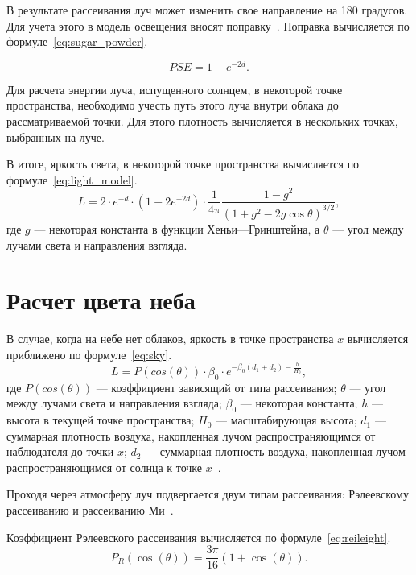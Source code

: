 В результате рассеивания луч может изменить свое направление на 180 градусов.
Для учета этого в модель освещения вносят поправку~\mbox{\cite{hzd, frostbite}}. Поправка вычисляется по формуле~\eqref{eq:sugar_powder}.

\begin{equation}
	\label{eq:sugar_powder}
	PSE = 1 - e ^ {-2 d}.
\end{equation}

Для расчета энергии луча, испущенного солнцем, в некоторой точке пространства, необходимо учесть путь этого луча внутри облака до рассматриваемой точки.
Для этого плотность вычисляется в нескольких точках, выбранных на луче.

В итоге, яркость света, в некоторой точке пространства вычисляется по формуле~\eqref{eq:light_model}.
\begin{equation}
	\label{eq:light_model}
	L = 2 \cdot e ^ {-d} \cdot (1 - 2 e ^ {-2d}) \cdot \frac{1}{4\pi} \frac{1 - g^2}{(1 + g^2 - 2g\cos \theta)^{3/2}},
\end{equation}
где $ g $ --- некоторая константа в функции Хеньи---Гринштейна, а $ \theta $ --- угол между лучами света и направления взгляда.

\section{Расчет цвета неба}

В случае, когда на небе нет облаков, яркость в точке пространства $x$ вычисляется приближено по формуле~\eqref{eq:sky}.
\begin{equation}
	\label{eq:sky}
	L = P(cos(\theta))  \cdot \beta_0 \cdot e^{-\beta_0 (d_1 + d_2) - \frac{h}{H_0}},
\end{equation}
где $P(cos(\theta))$ --- коэффициент зависящий от типа рассеивания; $\theta$ --- угол между лучами света и направления взгляда; $\beta_0$ --- некоторая константа; $h$ --- высота в текущей точке пространства; $H_0$ --- масштабирующая высота; $d_1$ --- суммарная плотность воздуха, накопленная лучом распространяющимся от наблюдателя до точки $x$; $d_2$ --- суммарная плотность воздуха, накопленная лучом распространяющимся от солнца к точке $x$~\cite{frostbite}.

Проходя через атмосферу луч подвергается двум типам рассеивания: Рэлеевскому 
рассеиванию и рассеиванию Ми~\cite{frostbite}. 


Коэффициент Рэлеевского рассеивания вычисляется по формуле~\eqref{eq:reileight}.
\begin{equation}
		\label{eq:reileight}
		P_R(\cos(\theta)) = \frac{3\pi}{16}(1 + \cos(\theta)).
\end{equation}


